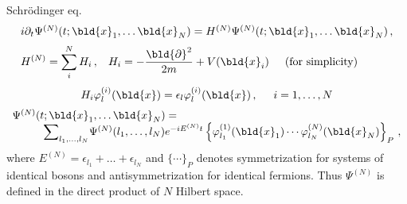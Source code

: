 Schr\"odinger eq.
\begin{equation}
\begin{array}{l}
i \partial_t
\Psi^{(N)}(t; \bld{x}_1, \dots \bld{x}_N) = H^{(N)} \Psi^{(N)}(t; \bld{x}_1, \dots \bld{x}_N)\,,
\vspace{2mm}
\\
\displaystyle
H^{(N)} = \sum_i^N H_i\,,
\hspace{3mm}
H_i = - \frac{\bld{\partial}^2}{2m} + V(\bld{x}_i)
\hspace{5mm}
\mbox{(for simplicity)}
\end{array}
\end{equation}
\begin{equation}
H_i \varphi_l^{(i)} (\bld{x} ) = \epsilon_l \varphi_l^{(i)} (\bld{x} )\,,
\hspace{5mm}
i = 1, \dots, N
\end{equation}
\begin{equation}
\begin{array}{l}
\Psi^{(N)}(t; \bld{x}_1, \dots \bld{x}_N)
=
\hspace{50mm}
\\
\hspace{10mm}
{\mathop{\displaystyle \sum}_{\scriptstyle  l_1, \dots, l_N} }
\Psi^{(N)}(l_1,\dots, l_N)
e^{-i E^{(N)} t}
\left\{
\varphi_{l_1}^{(1)} (\bld{x}_1 ) \cdots \varphi_{l_N}^{(N)} (\bld{x}_N )
\right\}_P\,,
\end{array}
\end{equation}
where $E^{(N)} = \epsilon_{l_1} + \dots + \epsilon_{l_N}$ and
$\{\cdots \}_P$ denotes symmetrization  for systems of identical bosons
and antisymmetrization for identical fermions.
Thus $\Psi^{(N)}$ is defined in the direct product of $N$ Hilbert space.

